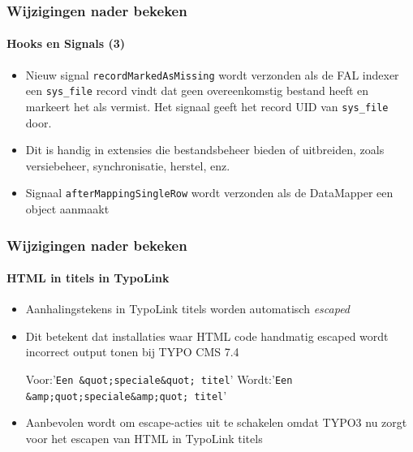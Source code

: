 \begin{frame}[fragile]
	\frametitle{Wijzigingen nader bekeken}
	\framesubtitle{Hooks en Signals (3)}

	\begin{itemize}

		\item Nieuw signal \texttt{recordMarkedAsMissing} wordt verzonden als de FAL indexer een
			\texttt{sys\_file} record vindt dat geen overeenkomstig bestand heeft en markeert het als
			vermist. Het signaal geeft het record UID van \texttt{sys\_file} door.

		\item Dit is handig in extensies die bestandsbeheer bieden of uitbreiden, zoals
			versiebeheer, synchronisatie, herstel, enz.

		\item Signaal \texttt{afterMappingSingleRow} wordt verzonden als de DataMapper een object aanmaakt

	\end{itemize}

\end{frame}


\begin{frame}[fragile]
	\frametitle{Wijzigingen nader bekeken}
	\framesubtitle{HTML in titels in TypoLink}

	\lstset{basicstyle=\tiny\ttfamily}

	\begin{itemize}

		\item Aanhalingstekens in TypoLink titels worden automatisch \textit{escaped}
		\item Dit betekent dat installaties waar HTML code handmatig escaped wordt incorrect output tonen
			bij TYPO CMS 7.4

			Voor:\tabto{1.8cm}'\texttt{Een \&quot;speciale\&quot; titel}'\newline
			Wordt:\tabto{1.8cm}'\texttt{Een \&amp;quot;speciale\&amp;quot; titel}'

		\item Aanbevolen wordt om escape-acties uit te schakelen omdat TYPO3 nu zorgt voor het escapen van
			HTML in TypoLink titels

	\end{itemize}

	\breakingchange

\end{frame}

